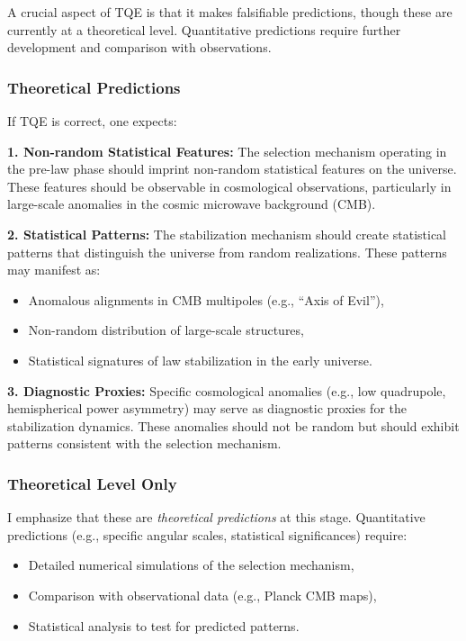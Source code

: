 \documentclass[12pt,a4paper]{article}
\theoremstyle{definition}
\theoremstyle{remark}
\begin{document}
A crucial aspect of TQE is that it makes falsifiable predictions, though these are currently at a theoretical level. Quantitative predictions require further development and comparison with observations.

\subsubsection{Theoretical Predictions}

If TQE is correct, one expects:

\textbf{1. Non-random Statistical Features:} The selection mechanism operating in the pre-law phase should imprint non-random statistical features on the universe. These features should be observable in cosmological observations, particularly in large-scale anomalies in the cosmic microwave background (CMB).

\textbf{2. Statistical Patterns:} The stabilization mechanism should create statistical patterns that distinguish the universe from random realizations. These patterns may manifest as:
\begin{itemize}
\item Anomalous alignments in CMB multipoles (e.g., ``Axis of Evil''),
\item Non-random distribution of large-scale structures,
\item Statistical signatures of law stabilization in the early universe.
\end{itemize}

\textbf{3. Diagnostic Proxies:} Specific cosmological anomalies (e.g., low quadrupole, hemispherical power asymmetry) may serve as diagnostic proxies for the stabilization dynamics. These anomalies should not be random but should exhibit patterns consistent with the selection mechanism.

\subsubsection{Theoretical Level Only}

I emphasize that these are \emph{theoretical predictions} at this stage. Quantitative predictions (e.g., specific angular scales, statistical significances) require:
\begin{itemize}
\item Detailed numerical simulations of the selection mechanism,
\item Comparison with observational data (e.g., Planck CMB maps),
\item Statistical analysis to test for predicted patterns.
\end{itemize}
\end{document}
